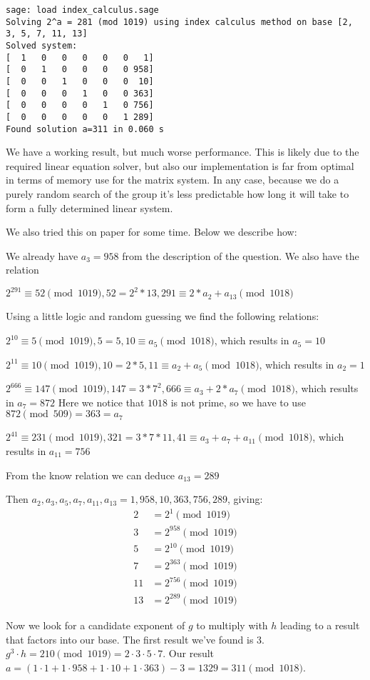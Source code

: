\documentclass{article}
\begin{document}
\begin{verbatim}
sage: load index_calculus.sage
Solving 2^a = 281 (mod 1019) using index calculus method on base [2, 3, 5, 7, 11, 13]
Solved system:
[  1   0   0   0   0   0   1]
[  0   1   0   0   0   0 958]
[  0   0   1   0   0   0  10]
[  0   0   0   1   0   0 363]
[  0   0   0   0   1   0 756]
[  0   0   0   0   0   1 289]
Found solution a=311 in 0.060 s
\end{verbatim}

We have a working result, but much worse performance.
This is likely due to the required linear equation solver, but also our implementation is far from optimal in terms of memory use for the matrix system.
In any case, because we do a purely random search of the group it's less predictable how long it will take to form a fully determined linear system.

We also tried this on paper for some time. Below we describe how:

We already have $a_3 = 958$ from the description of the question. We also have the relation 

$2^{291} \equiv 52 \pmod{1019}, 52 = 2^2 * 13, 291 \equiv 2*a_2 + a_{13} \pmod{1018} $

Using a little logic and random guessing we find the following relations:

$2^{10} \equiv 5 \pmod{1019}, 5 = 5, 10 \equiv a_{5} \pmod{1018} $, which results in $a_5 = 10$

$2^{11} \equiv 10 \pmod{1019}, 10 = 2*5, 11 \equiv a_2 + a_{5} \pmod{1018} $, which results in $a_2 = 1$

$2^{666} \equiv 147 \pmod{1019}, 147 = 3*7^2, 666 \equiv a_3 + 2*a_{7} \pmod{1018} $, which results in $a_7 = 872$
Here we notice that $1018$ is not prime, so we have to use $872 \pmod{509} = 363 = a_7$

$2^{41} \equiv 231 \pmod{1019}, 321 = 3*7*11, 41 \equiv a_3 + a_7 + a_11 \pmod{1018} $, which results in $a_11 = 756$

From the know relation we can deduce $a_{13} = 289$

Then $a_2, a_3, a_5, a_7, a_{11}, a_{13} = 1, 958, 10, 363, 756, 289$, giving:
\begin{align}
	2 &= 2^1 \pmod{1019} \\
	3 &= 2^{958} \pmod{1019} \\
	5 &= 2^{10} \pmod{1019} \\
	7 &= 2^{363} \pmod{1019} \\
       11 &= 2^{756} \pmod{1019} \\
	13 &= 2^{289} \pmod{1019}
\end{align}

Now we look for a candidate exponent of $g$ to multiply with $h$ leading to a result that factors into our base.
The first result we've found is $3$.
$g^3 \cdot h = 210 \pmod{1019} = 2 \cdot 3 \cdot 5 \cdot 7 $.
Our result $a = (1 \cdot 1 + 1 \cdot 958 + 1 \cdot 10 + 1 \cdot 363) - 3 = 1329 = 311 \pmod{1018}$.
\end{document}
